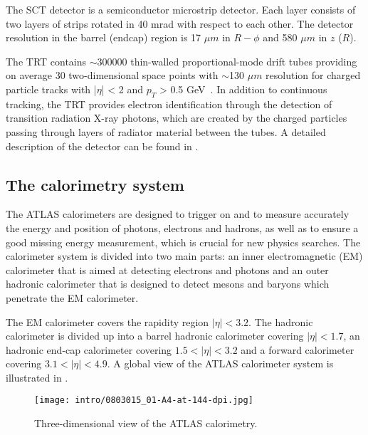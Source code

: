 The SCT detector is a semiconductor microstrip detector. Each layer consists of two layers of strips rotated in 40 mrad with respect to each other.
The detector resolution in the barrel (endcap) region is 17 $\mu m$ in $R-\phi$ and 580 $\mu m$ in $z$ ($R$).

The TRT contains $\sim$300000 thin-walled proportional-mode drift tubes providing on average 30 two-dimensional 
space points with $\sim$130 $\mu m$ resolution for charged particle tracks with |$\eta$| < 2 and $p_T$ > 0.5 GeV~\cite{Abat:2008zza,Abat:2008zzb,Abat:2008zz}.
In addition to continuous tracking, the TRT provides electron identification through the detection of transition radiation X-ray photons, which are created by the charged particles passing through layers of radiator material between the tubes.
A detailed description of the detector can be found in .

\subsection{The calorimetry system}

The ATLAS calorimeters are designed to trigger on and to measure accurately the energy and position of photons, electrons and hadrons, as well as to ensure a good missing energy measurement, which is crucial for new physics searches. The calorimeter system is divided into two main parts: an inner electromagnetic (EM) calorimeter that is aimed at detecting electrons and photons and an outer hadronic calorimeter that is designed to detect mesons and baryons which penetrate the EM calorimeter.

The EM calorimeter covers the rapidity region $|\eta| < 3.2$.
The hadronic calorimeter is divided up into a barrel hadronic calorimeter covering $|\eta| < 1.7$, an hadronic end-cap calorimeter covering $1.5 < |\eta| < 3.2$ and a forward calorimeter covering $3.1 < |\eta| < 4.9$. A global view of the ATLAS calorimeter system is illustrated in .

\begin{figure}[h!]
\centering
 \texttt{[image: intro/0803015\_01-A4-at-144-dpi.jpg]}
 \caption{Three-dimensional view of the ATLAS calorimetry.}
\label{fig:Calo}
\end{figure}

